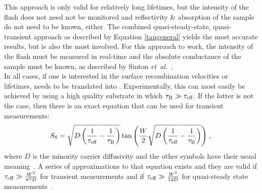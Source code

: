 This approach is only valid for relatively long lifetimes, but the intensity of the flash does not need not be monitored and reflectivity \& absorption of the sample do not need to be known, either. The combined quasi-steady-state, quasi-transient approach as described by Equation \eqref{taugeneral} yields the most accurate results, but is also the most involved. For this approach to work, the intensity of the flash must be measured in real-time and the absolute conductance of the sample must be known, as described by Sinton \emph{et~al.}~\cite{sinton1,sinton2}.\\
In all cases, if one is interested in the surface recombination velocities or lifetimes, \teff{} needs to be translated into \tbulk{}. Experimentally, this can most easily be achieved by using a high quality substrate in which $\tau_{\text{B}} \gg \tau_{\text{eff}}$. If the latter is not the case, then there is an exact equation that can be used for transient measurements:
\begin{equation}
\label{exacttransient}
	S_{\text{S}} = \sqrt{D \left( \frac{1}{\tau_{\text{eff}}} - \frac{1}{\tau_{\text{B}}} \right)} \tan \left( \frac{W}{2} \sqrt{D \left( \frac{1}{\tau_{\text{eff}}} - \frac{1}{\tau_{\text{B}}} \right)} \right) \, ,
\end{equation}
where $D$ is the minority carrier diffusivity and the other symbols have their usual meaning~\cite{luke_lifetime}. A series of approximations to that equation exists and they are valid if $\tau_{\text{eff}} \gg \frac{W^2}{\pi ^2 D}$ for transient measurements and if $\tau_{\text{eff}} \gg \frac{W^2}{12 D}$ for quasi-steady state measurements~\cite{sproul_lifetime}. 
